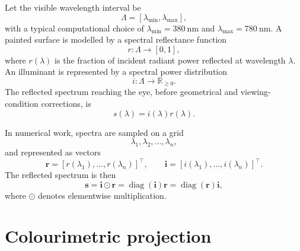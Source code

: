 \documentclass[11pt,a4paper]{article}
\newcommand{\R}{\mathbb{R}}
\newcommand{\diag}{\operatorname{diag}}
\newcommand{\vect}[1]{\boldsymbol{#1}}
\newcommand{\hadamard}{\odot}
\begin{document}
Let the visible wavelength interval be
\begin{equation}
\Lambda=[\lambda_{\min},\lambda_{\max}],
\end{equation}
with a typical computational choice of $\lambda_{\min}=\SI{380}{\nano\metre}$ and $\lambda_{\max}=\SI{780}{\nano\metre}$. A painted surface is modelled by a spectral reflectance function
\begin{equation}
 r : \Lambda \rightarrow [0,1],
\end{equation}
where $r(\lambda)$ is the fraction of incident radiant power reflected at wavelength $\lambda$. An illuminant is represented by a spectral power distribution
\begin{equation}
 i : \Lambda \rightarrow \R_{\ge 0}.
\end{equation}
The reflected spectrum reaching the eye, before geometrical and viewing-condition corrections, is
\begin{equation}
 s(\lambda)=i(\lambda)r(\lambda).
 \label{eq:reflected_spectrum}
\end{equation}

In numerical work, spectra are sampled on a grid
\begin{equation}
 \lambda_1,\lambda_2,\ldots,\lambda_n,
\end{equation}
and represented as vectors
\begin{equation}
 \vect{r}=[r(\lambda_1),\ldots,r(\lambda_n)]^\top,\qquad
 \vect{i}=[i(\lambda_1),\ldots,i(\lambda_n)]^\top.
\end{equation}
The reflected spectrum is then
\begin{equation}
 \vect{s}=\vect{i}\hadamard\vect{r}
      =\diag(\vect{i})\vect{r}
      =\diag(\vect{r})\vect{i},
 \label{eq:discrete_reflected_spectrum}
\end{equation}
where $\hadamard$ denotes elementwise multiplication.

\section{Colourimetric projection}
\end{document}
